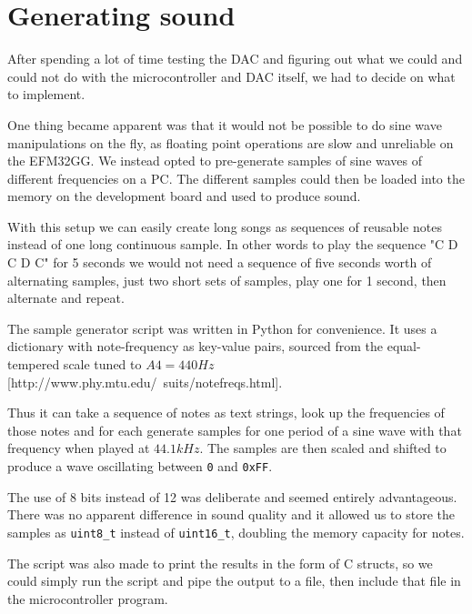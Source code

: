 \section{Generating sound}
After spending a lot of time testing the DAC and figuring out what we could and could not do with the microcontroller and DAC itself, we had to decide on what to implement.

One thing became apparent was that it would not be possible to do sine wave manipulations on the fly, as floating point operations are slow and unreliable on the EFM32GG. We instead opted to pre-generate samples of sine waves of different frequencies on a PC. The different samples could then be loaded into the memory on the development board and used to produce sound.

With this setup we can easily create long songs as sequences of reusable notes instead of one long continuous sample. In other words to play the sequence "C D C D C" for 5 seconds we would not need a sequence of five seconds worth of alternating samples, just two short sets of samples, play one for 1 second, then alternate and repeat.

The sample generator script was written in Python for convenience. It uses a dictionary with note-frequency as key-value pairs, sourced from the equal-tempered scale tuned to $A4 = 440Hz$ [http://www.phy.mtu.edu/~suits/notefreqs.html].

Thus it can take a sequence of notes as text strings, look up the frequencies of those notes and for each generate samples for one period of a sine wave with that frequency when played at $44.1kHz$. The samples are then scaled and shifted to produce a wave oscillating between \texttt{0} and \texttt{0xFF}.

The use of 8 bits instead of 12 was deliberate and seemed entirely advantageous. There was no apparent difference in sound quality and it allowed us to store the samples as \texttt{uint8\_t} instead of \texttt{uint16\_t}, doubling the memory capacity for notes.

The script was also made to print the results in the form of C structs, so we could simply run the script and pipe the output to a file, then include that file in the microcontroller program.

